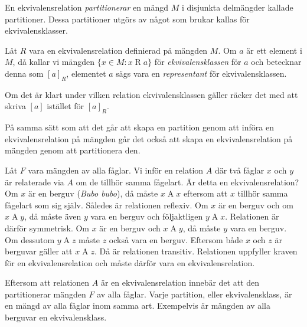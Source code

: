 En ekvivalensrelation \emph{partitionerar} en mängd \(M\) i disjunkta
delmängder kallade partitioner.
Dessa partitioner utgörs av något som brukar
kallas för ekvivalensklasser. %
\begin{definition}\label{def:Ekvivalensklass}
  Låt \(R\) vara en ekvivalensrelation definierad på mängden \(M\).
  Om \(a\) är ett element i \(M\), då kallar vi mängden
  \(\{x\in M\colon x\mathop R a\}\) för \emph{ekvivalensklassen} för \(a\) och 
  betecknar denna som \([a]_R\), elementet \(a\) sägs vara en 
  \emph{representant} för ekvivalensklassen.
\end{definition}
Om det är klart under vilken relation ekvivalensklassen gäller räcker det med
att skriva \([a]\) istället för \([a]_R\).

På samma sätt som att det går att skapa en partition genom att införa en
ekvivalensrelation på mängden går det också att skapa en ekvivalensrelation på
mängden genom att partitionera den.

\begin{example}
  Låt \(F\) vara mängden av alla fåglar.
  Vi inför en relation \(A\) där två fåglar \(x\) och \(y\) är relaterade via
  \(A\) om de tillhör samma fågelart.
  Är detta en ekvivalensrelation?
  Om \(x\) är en berguv (\emph{Bubo bubo}), då måste \(x\mathop A x\) eftersom 
  att \(x\) tillhör samma fågelart som sig själv.
  Således är relationen reflexiv.
  Om \(x\) är en berguv och om \(x\mathop A y\), då måste även \(y\) vara en 
  berguv och följaktligen \(y\mathop A x\).
  Relationen är därför symmetrisk.
  Om \(x\) är en berguv och \(x\mathop A y\), då måste \(y\) vara en berguv.
  Om dessutom \(y\mathop A z\) måste \(z\) också vara en berguv.
  Eftersom både \(x\) och \(z\) är berguvar gäller att \(x\mathop A z\).
  Då är relationen transitiv.
  Relationen uppfyller kraven för en ekvivalensrelation och måste
  därför vara en ekvivalensrelation.

  Eftersom att relationen \(A\) är en ekvivalensrelation innebär det att den
  partitionerar mängden \(F\) av alla fåglar.
  Varje partition, eller ekvivalensklass, är en mängd av alla fåglar inom
  samma art.
  Exempelvis är mängden av alla berguvar en ekvivalensklass.
\end{example}

